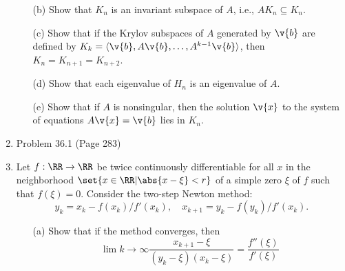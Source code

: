 \documentclass[11pt]{article}
\begin{document}
\begin{enumerate}
\begin{enumerate}
            \item[(b)]
                Show that $K_n$ is an invariant subspace of $A$, i.e., $AK_n \subseteq K_n$.

            \item[(c)]
                Show that if the Krylov subspaces of $A$ generated by $\v{b}$
                are defined by $K_k = \langle \v{b}, A\v{b}, \ldots, A^{k-1}\v{b} \rangle$,
                then $K_n = K_{n+1} = K_{n+2}$.

            \item[(d)]
                Show that each eigenvalue of $H_n$ is an eigenvalue of $A$.

            \item[(e)]
                Show that if $A$ is nonsingular, then the solution $\v{x}$ to the system
                of equations $A\v{x} = \v{b}$ lies in $K_n$.
        \end{enumerate}

    \item %
        Problem 36.1 (Page 283)

    \item %
        Let $f:\RR \to \RR$ be twice continuously differentiable for all $x$ in
        the neighborhood $\set{x \in \RR | \abs{x - \xi} < r}$ of a simple zero
        $\xi$ of $f$ such that $f(\xi) = 0$.
        Consider the two-step Newton method:
        \[
            y_k = x_k - f(x_k)/f'(x_k), \quad x_{k+1} = y_k - f(y_k)/f'(x_k).
        \]
        \begin{enumerate}
            \item[(a)] %
                Show that if the method converges, then
                \[
                    \lim{k \to \infty}{\frac{x_{k+1} - \xi}{(y_k - \xi)(x_k - \xi)}} = \frac{f''(\xi)}{f'(\xi)}
                \]


\end{enumerate}
\end{enumerate}
\end{document}
